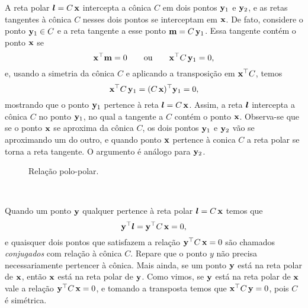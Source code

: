 A reta polar $\boldsymbol{l}=C\,\mathbf{x}$ intercepta a cônica 
$C$ em dois pontos ${\bf y}_1$ e ${\bf y}_2$, e as retas tangentes à cônica $C$ nesses dois pontos se interceptam em $\mathbf{x}$. De fato, considere o ponto ${\bf y}_1 \in C$ e a reta tangente a esse ponto ${\bf m}=C\,{\bf y}_1$. Essa tangente contém o ponto $\mathbf{x}$ se 
\begin{equation*}
\mathbf{x}^\top{\bf m}=0\qquad\text{ou}\qquad\mathbf{x}^\top C\,{\bf y}_1=0,
\end{equation*}  
e, usando a simetria da cônica $C$ e aplicando a transposição em $\mathbf{x}^\top C$, temos
\begin{equation*}
\mathbf{x}^\top C\,{\bf y}_1=(C\,\mathbf{x})^\top{\bf y}_1=0,
\end{equation*}
mostrando que o ponto ${\bf y}_1$ pertence à reta $\boldsymbol{l}=C\,\mathbf{x}$. Assim, a reta $\boldsymbol{l}$ intercepta a cônica $C$ no ponto ${\bf y}_1$, no qual a tangente a $C$ contém o ponto $\mathbf{x}$. Observa-se que se o ponto $\mathbf{x}$ se aproxima da cônica $C$, os dois pontos ${\bf y}_1$ e ${\bf y}_2$ vão se aproximando um do outro, e quando ponto $\mathbf{x}$ pertence à conica $C$ a reta polar se torna a reta tangente. O argumento é análogo para ${\bf y}_2$.
\begin{figure}[!htb]{\textwidth}
\caption{Relaç\~ao polo-polar.}
\hfill
{}\hfill
{}
\label{fig.polo-polar}
\end{figure}\\


Quando um ponto ${\bf y}$ qualquer pertence à reta polar $\boldsymbol{l}=C\,\mathbf{x}$ temos que 
\begin{equation*}
{\bf y}^\top\boldsymbol{l}={\bf y}^\top C\,\mathbf{x}=0,
\end{equation*}
e quaisquer dois pontos que satisfazem a relação ${\bf y}^\top C\,\mathbf{x}=0$ são chamados \textit{conjugados} com relação à cônica $C$. Repare que o ponto $y$ não precisa necessariamente pertencer à cônica. Mais ainda, se um ponto ${\bf y}$ está na reta polar de $\mathbf{x}$, então $\mathbf{x}$ está na reta polar de ${\bf y}$. Como vimos, se ${\bf y}$ está na reta polar de $\mathbf{x}$ vale a relação ${\bf y}^\top C\,\mathbf{x}=0$, e tomando a transposta temos que $\mathbf{x}^\top C\,{\bf y}=0$, pois $C$ é simétrica. 
